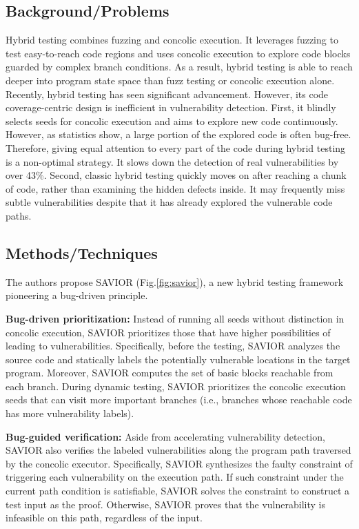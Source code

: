 \subsection{Background/Problems}
Hybrid testing combines fuzzing and concolic execution. It leverages fuzzing to test easy-to-reach code regions and uses concolic execution to explore code blocks guarded by complex branch conditions. As a result, hybrid testing is able to reach deeper into program state space than fuzz testing or concolic execution alone. Recently, hybrid testing has seen significant advancement. However, {its code coverage-centric design is inefficient in vulnerability detection}. First, it {blindly} selects seeds for concolic execution and aims to explore new code continuously. However, as statistics show, a large portion of the explored code is often bug-free. Therefore, giving equal attention to every part of the code during hybrid testing is a non-optimal strategy. It slows down the detection of real vulnerabilities by over 43\%. Second, classic hybrid testing quickly moves on after reaching a chunk of code, rather than examining the hidden defects inside. It may frequently {miss subtle vulnerabilities} despite that it has already explored the vulnerable code paths.
\subsection{Methods/Techniques}
The authors propose SAVIOR (Fig.\ref{fig:savior}), a new hybrid testing framework pioneering a bug-driven principle.

\textbf{Bug-driven prioritization:} Instead of running all seeds without distinction in concolic execution, SAVIOR prioritizes those that have higher possibilities of leading to vulnerabilities.  Specifically, before the testing, SAVIOR analyzes the source code and {statically labels the potentially vulnerable locations} in the target program.  Moreover, SAVIOR computes the set of basic blocks reachable from each branch. During dynamic testing, SAVIOR {prioritizes the concolic execution seeds that can visit more important branches} (i.e., branches whose reachable code has more vulnerability labels).  

\textbf{Bug-guided verification: }Aside from accelerating vulnerability detection, SAVIOR also verifies the labeled vulnerabilities along the program path traversed by the concolic executor.  Specifically, SAVIOR synthesizes the faulty constraint of triggering each vulnerability on the execution path. If such constraint under the current path condition is satisfiable, SAVIOR solves the constraint to construct a test input as the proof. Otherwise, SAVIOR proves that the vulnerability is infeasible on this path, regardless of the input.

